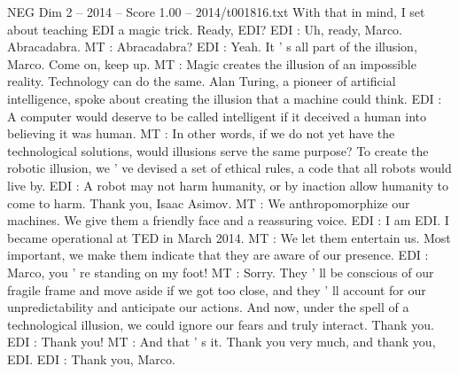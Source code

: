 \begin{textsample}{NEG Dim 2 – 2014 – Score 1.00 – 2014/t001816.txt}
With that in mind, I set about teaching EDI a magic trick.
Ready, EDI?
EDI : Uh, ready, Marco.
Abracadabra.
MT : Abracadabra?
EDI : Yeah.
It ' s all part of the illusion, Marco.
Come on, keep up.
MT : Magic creates the illusion of an impossible reality.
Technology can do the same.
Alan Turing, a pioneer of artificial intelligence, spoke about creating the illusion that a machine could think.
EDI : A computer would deserve to be called intelligent if it deceived a human into believing it was human.
MT : In other words, if we do not yet have the technological solutions, would illusions serve the same purpose?
To create the robotic illusion, we ' ve devised a set of ethical rules, a code that all robots would live by.
EDI : A robot may not harm humanity, or by inaction allow humanity to come to harm.
Thank you, Isaac Asimov.
MT : We anthropomorphize our machines.
We give them a friendly face and a reassuring voice.
EDI : I am EDI.
I became operational at TED in March 2014.
MT : We let them entertain us.
Most important, we make them indicate that they are aware of our presence.
EDI : Marco, you ' re standing on my foot!
MT : Sorry.
They ' ll be conscious of our fragile frame and move aside if we got too close, and they ' ll account for our unpredictability and anticipate our actions.
And now, under the spell of a technological illusion, we could ignore our fears and truly interact.
Thank you.
EDI : Thank you!
MT : And that ' s it.
Thank you very much, and thank you, EDI.
EDI : Thank you, Marco.

\end{textsample}
